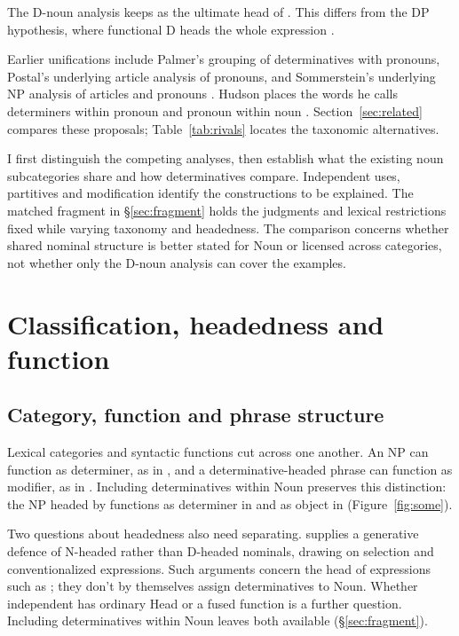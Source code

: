 \documentclass[12pt]{article}
\begin{document}
The D-noun analysis keeps  as the ultimate head of . This differs from the DP hypothesis, where functional D heads the whole expression \citep{abney1987}.

Earlier unifications include Palmer's grouping of determinatives with pronouns, Postal's underlying article analysis of pronouns, and Sommerstein's underlying NP analysis of articles and pronouns \citep{palmer1924,postal1966,sommerstein1972}. Hudson places the words he calls determiners within pronoun and pronoun within noun \citep{hudson2004determiners,hudson2010wordgrammar}. Section~\ref{sec:related} compares these proposals; Table~\ref{tab:rivals} locates the taxonomic alternatives.

I first distinguish the competing analyses, then establish what the existing noun subcategories share and how determinatives compare. Independent uses, partitives and modification identify the constructions to be explained. The matched fragment in §\ref{sec:fragment} holds the judgments and lexical restrictions fixed while varying taxonomy and headedness. The comparison concerns whether shared nominal structure is better stated for Noun or licensed across categories, not whether only the D-noun analysis can cover the examples.

\section{Classification, headedness and function}\label{sec:alternatives}

\subsection{Category, function and phrase structure}

Lexical categories and syntactic functions cut across one another. An NP can function as determiner, as in , and a determinative-headed phrase can function as modifier, as in  \citep{payne2010,pullummiller2022nps}. Including determinatives within Noun preserves this distinction: the NP headed by  functions as determiner in  and as object in  (Figure~\ref{fig:some}).

Two questions about headedness also need separating. \textcite{bruening2020nominal} supplies a generative defence of N-headed rather than D-headed nominals, drawing on selection and conventionalized expressions. Such arguments concern the head of expressions such as ; they don't by themselves assign determinatives to Noun. Whether independent  has ordinary Head or a fused function is a further question. Including determinatives within Noun leaves both available (§\ref{sec:fragment}).
\end{document}
